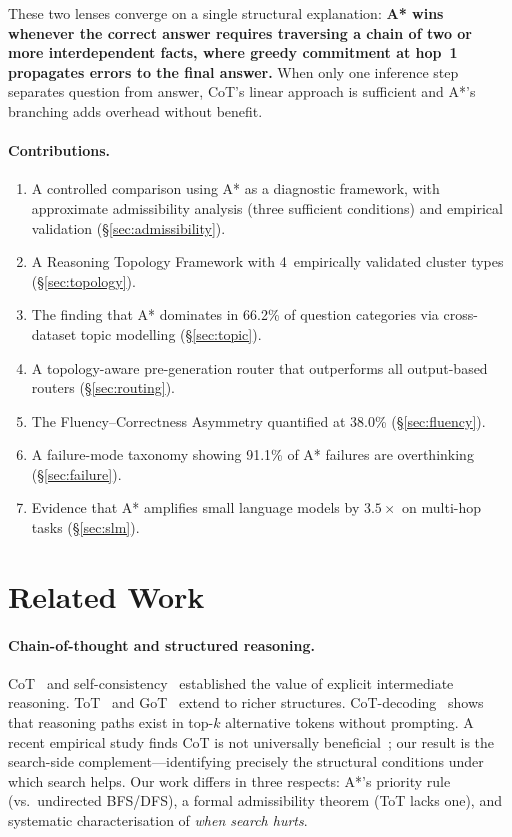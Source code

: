 \documentclass{article}
\begin{document}
These two lenses converge on a single structural explanation: \textbf{A*
wins whenever the correct answer requires traversing a chain of two or more
interdependent facts, where greedy commitment at hop~1 propagates errors to
the final answer.}  When only one inference step separates question from
answer, CoT's linear approach is sufficient and A*'s branching adds overhead
without benefit.

\paragraph{Contributions.}
\begin{enumerate}[leftmargin=1.5em,itemsep=2pt]
\item A controlled comparison using A* as a diagnostic framework, with
approximate admissibility analysis (three sufficient conditions) and
empirical validation (\S\ref{sec:admissibility}).
\item A Reasoning Topology Framework with 4~empirically validated cluster
types (\S\ref{sec:topology}).
\item The finding that A* dominates in 66.2\% of question categories via
cross-dataset topic modelling (\S\ref{sec:topic}).
\item A topology-aware pre-generation router that outperforms all
output-based routers (\S\ref{sec:routing}).
\item The Fluency--Correctness Asymmetry quantified at 38.0\%
(\S\ref{sec:fluency}).
\item A failure-mode taxonomy showing 91.1\% of A* failures are
overthinking (\S\ref{sec:failure}).
\item Evidence that A* amplifies small language models by $3.5\times$ on
multi-hop tasks (\S\ref{sec:slm}).
\end{enumerate}

\section{Related Work}
\label{sec:related}

\paragraph{Chain-of-thought and structured reasoning.}
CoT~\citep{wei2022chain} and self-consistency~\citep{wang2023self} established
the value of explicit intermediate reasoning.  ToT~\citep{yao2024tree} and
GoT~\citep{besta2024graph} extend to richer structures.
CoT-decoding~\citep{wang2024chain} shows that reasoning paths exist in
top-$k$ alternative tokens without prompting.  A recent empirical study finds
CoT is not universally beneficial~\citep{meincke2025decreasing}; our result
is the search-side complement---identifying precisely the structural conditions
under which search helps.  Our work differs in three respects: A*'s priority
rule (vs.\ undirected BFS/DFS), a formal admissibility theorem (ToT lacks
one), and systematic characterisation of \emph{when search hurts}.
\end{document}

